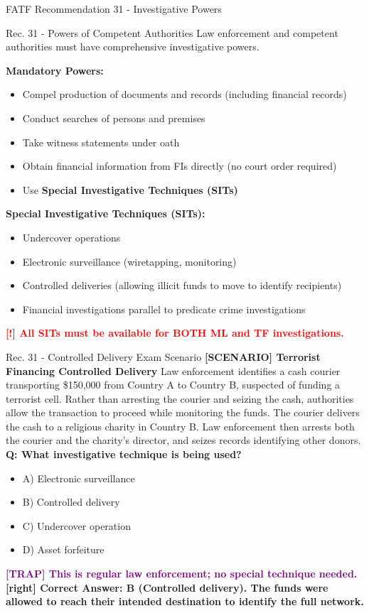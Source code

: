 \documentclass[11pt,a4paper]{beamer}
\newcommand{\redflag}[1]{\textcolor{red}{\textbf{[!] #1}}}
\newcommand{\trap}[1]{\textcolor{purple}{\textbf{[TRAP] #1}}}
\newcommand{\correct}[1]{\textcolor{green!50!black}{\textbf{[right] #1}}}
\newcommand{\scenario}[1]{\textcolor{blue!70!black}{\textbf{[SCENARIO] #1}}}
\begin{document}
\begin{frame}{FATF Recommendation 31 - Investigative Powers}
\begin{block}{Rec. 31 - Powers of Competent Authorities}
Law enforcement and competent authorities must have comprehensive investigative powers.
\end{block}
\textbf{Mandatory Powers:}
\begin{itemize}
\item Compel production of documents and records (including financial records)
\item Conduct searches of persons and premises
\item Take witness statements under oath
\item Obtain financial information from FIs directly (no court order required)
\item Use \textbf{Special Investigative Techniques (SITs)}
\end{itemize}
\textbf{Special Investigative Techniques (SITs):}
\begin{itemize}
\item Undercover operations
\item Electronic surveillance (wiretapping, monitoring)
\item Controlled deliveries (allowing illicit funds to move to identify recipients)
\item Financial investigations parallel to predicate crime investigations
\end{itemize}
\redflag{All SITs must be available for BOTH ML and TF investigations.}
\end{frame}

\begin{frame}{Rec. 31 - Controlled Delivery Exam Scenario}
\scenario{Terrorist Financing Controlled Delivery}
Law enforcement identifies a cash courier transporting \$150,000 from Country A to Country B, suspected of funding a terrorist cell. Rather than arresting the courier and seizing the cash, authorities allow the transaction to proceed while monitoring the funds. The courier delivers the cash to a religious charity in Country B. Law enforcement then arrests both the courier and the charity's director, and seizes records identifying other donors.
\vspace{0.2cm}
\textbf{Q: What investigative technique is being used?}
\begin{itemize}
\item A) Electronic surveillance
\item B) Controlled delivery
\item C) Undercover operation
\item D) Asset forfeiture
\end{itemize}
\trap{This is regular law enforcement; no special technique needed.}
\correct{Correct Answer: B (Controlled delivery). The funds were allowed to reach their intended destination to identify the full network.}
\end{frame}
\end{document}
